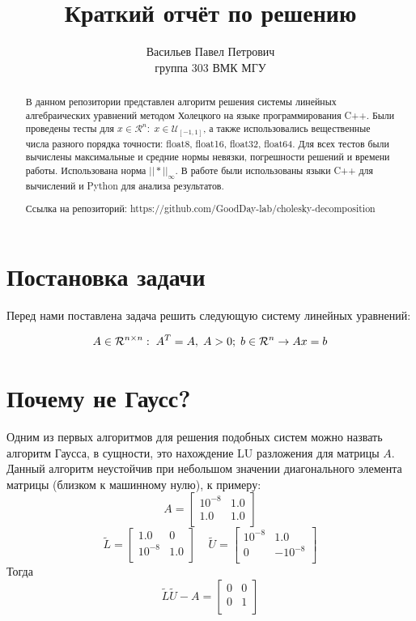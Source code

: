 \documentclass[12pt]{article}
\title{Краткий отчёт по решению}
\author{Васильев Павел Петрович \\ группа 303 ВМК МГУ}
\begin{document}
	
	\maketitle
	
	\begin{abstract}
	В данном репозитории представлен алгоритм решения системы линейных алгебраических уравнений методом Холецкого на языке программирования C++. Были проведены тесты для $x \in \mathcal{R}^n: \; x \in \mathcal{U}_{[-1, 1]}$, а также использовались вещественные числа разного порядка точности: float8, float16, float32, float64. Для всех тестов были вычислены максимальные и средние нормы невязки, погрешности решений и времени работы. Использована норма $||*||_{\infty}$. В работе были использованы языки C++ для вычислений и Python для анализа результатов.
	
	Ссылка на репозиторий:  https://github.com/GoodDay-lab/cholesky-decomposition
	\end{abstract}
	
	\section{Постановка задачи}
	Перед нами поставлена задача решить следующую систему линейных уравнений:
	
	\begin{align}
	\mathnormal{A} \in \mathcal{R}^{n \times n}: \; A^T = A, \; A > 0; \; b \in \mathcal{R}^n \rightarrow
	Ax = b
	\end{align}
		
	\section{Почему не Гаусс?}
		Одним из первых алгоритмов для решения подобных систем можно назвать алгоритм Гаусса, в сущности, это нахождение LU разложения для матрицы $A$. Данный алгоритм неустойчив при небольшом значении диагонального элемента матрицы (близком к машинному нулю), к примеру:
	\[
	A = 
	\begin{bmatrix}
		10^{-8} & 1 .0 \\
		1.0 & 1.0 \\
	\end{bmatrix}
	\] 
	\[
	\tilde{L} =
	\begin{bmatrix}
		1.0 & 0 \\
		10^{-8} & 1.0 \\
	\end{bmatrix}
	\;\;\;\;
	\tilde{U} =
	\begin{bmatrix}
		10^{-8} & 1.0 \\
		0 & -10^{-8} \\
	\end{bmatrix}
	\]
	Тогда 
	\[
	\tilde{L} \tilde{U} - A =
	\begin{bmatrix}
		0 & 0 \\
		0 & 1 \\
	\end{bmatrix}
	\]
	
\end{document}
